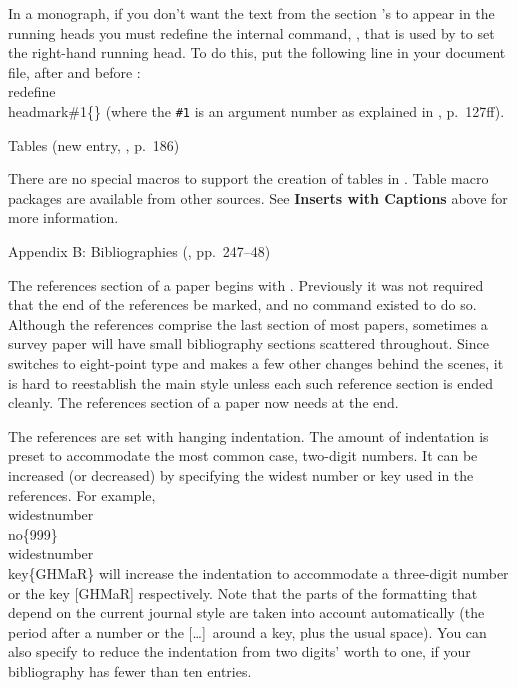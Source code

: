 In a monograph, if you don't want
the text from the section 's to appear in the running heads
you must redefine the internal command, , that is used
by  to set the right-hand running head. To do this, put the
following line in your document file, after  and
before :
\beginexample{}
\\redefine\\headmark\#1\{\}
\endexample
\noindent (where the {\tt\#1} is an argument number as explained in \Joy,
p.~127ff).


\subhead Tables {\rm (new entry, \Joy, p.~186)}
\endsubhead

There are no special macros to support the creation of tables in \AmSTeX{}.
Table macro packages are available from other sources.
See {\bf Inserts with Captions} above for more information.


\subhead Appendix B: Bibliographies {\rm (\Joy, pp.~247--48)}
\endsubhead

The references section of a paper begins with .  Previously it
was not required that the end of the references be marked, and no command
existed to do so.  Although the references comprise the last section of most
papers, sometimes a survey paper will have small bibliography sections
scattered throughout.  Since  switches to eight-point type and
makes a few other changes behind the scenes, it is hard to reestablish the
main style unless each such reference section is ended cleanly.  The
references section of a paper now needs  at the end.

The references are set with hanging indentation.  The amount of indentation
is preset to accommodate the most common case, two-digit numbers.
It can be increased (or decreased) by specifying the widest
number or key used in the references. For example,
\beginexample{}
\\widestnumber\\no\{999\}
\\widestnumber\\key\{GHMaR\}
\endexample
\noindent
will increase the indentation to accommodate a three-digit number or the key
\hbox{[GHMaR]} respectively.  Note that the parts of the formatting that
depend on the current journal style are taken into account automatically
(the period after a number or the [\dots]\ around a key, plus the usual
space). You can also specify  to reduce the
indentation from two digits' worth to one, if your bibliography has
fewer than ten entries.

